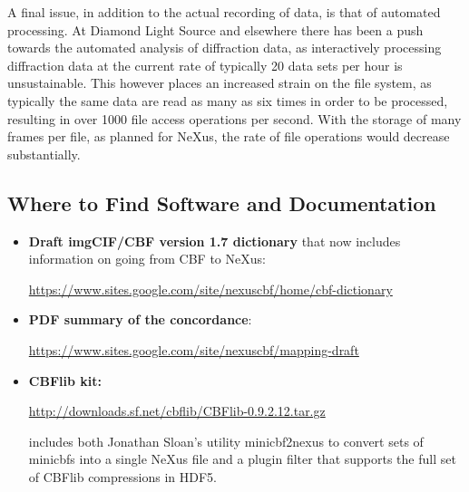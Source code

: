 \documentclass[11pt]{a0poster}
\begin{document}
\begin{minipage}[]{0.29\linewidth}
A final issue, in addition to the actual recording of data, is that
of automated processing. At Diamond Light Source and elsewhere there
has been a push towards the automated analysis of diffraction data, as
interactively processing diffraction data at the current rate of
typically 20 data sets per hour is unsustainable. This however places an
increased strain on the file system, as typically the same data are read as
many as six times in order to be processed, resulting in over 1000 file access
operations per second. With the storage of many frames per file, as
planned for NeXus, the rate of file operations would decrease substantially.

\vspace{-4mm}%
\subsection*{Where to Find Software and Documentation}

\vspace{-4mm}%
\begin{itemize}
\item{{\bf Draft imgCIF/CBF version 1.7 dictionary} that now includes information on going from CBF to NeXus:

{\fontsize{22}{24}\selectfont \url{https://www.sites.google.com/site/nexuscbf/home/cbf-dictionary}}
}

\item{{\bf PDF summary of the concordance}:

{\fontsize{22}{24}\selectfont \url{https://www.sites.google.com/site/nexuscbf/mapping-draft}}
}

\item{{\bf CBFlib kit:}

{\fontsize{22}{24}\selectfont \url{http://downloads.sf.net/cbflib/CBFlib-0.9.2.12.tar.gz}}

includes both Jonathan Sloan's utility minicbf2nexus to
convert sets of minicbfs into a single NeXus file and
a plugin filter that supports the full set of CBFlib compressions
in HDF5.}
\end{itemize}


\end{minipage}
\end{document}
